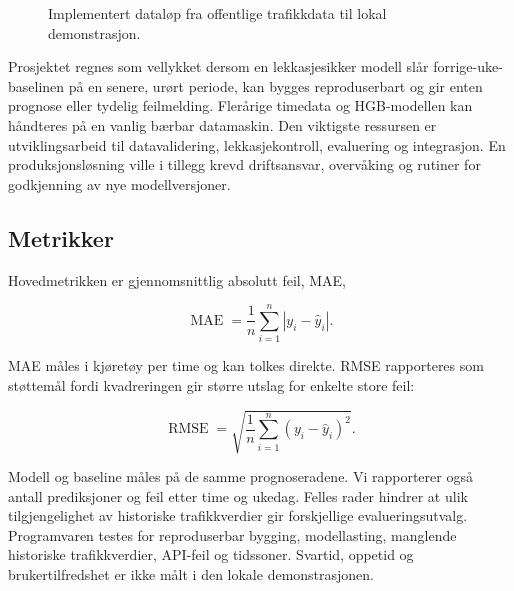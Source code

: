 \begin{figure}[htbp]
  \centering
  \resizebox{\textwidth}{!}{}
  \caption{Implementert dataløp fra offentlige trafikkdata til lokal demonstrasjon.}
  \label{fig:pipeline}
\end{figure}
\FloatBarrier

Prosjektet regnes som vellykket dersom en lekkasjesikker modell slår
forrige-uke-baselinen på en senere, urørt periode, kan bygges reproduserbart og gir
enten prognose eller tydelig feilmelding. Flerårige timedata og HGB-modellen kan
håndteres på en vanlig bærbar datamaskin. Den viktigste ressursen er
utviklingsarbeid til datavalidering, lekkasjekontroll, evaluering og integrasjon.
En produksjonsløsning ville i tillegg krevd driftsansvar, overvåking og rutiner for
godkjenning av nye modellversjoner.

\subsection{Metrikker}

Hovedmetrikken er gjennomsnittlig absolutt feil, MAE,

\begin{equation}
  \operatorname{MAE}=\frac{1}{n}\sum_{i=1}^{n}|y_i-\hat{y}_i|.
\end{equation}

MAE måles i kjøretøy per time og kan tolkes direkte. RMSE rapporteres som støttemål
fordi kvadreringen gir større utslag for enkelte store feil:

\begin{equation}
  \operatorname{RMSE}=\sqrt{\frac{1}{n}\sum_{i=1}^{n}(y_i-\hat{y}_i)^2}.
\end{equation}

Modell og baseline måles på de samme prognoseradene. Vi rapporterer også antall
prediksjoner og feil etter time og ukedag. Felles rader hindrer at ulik
tilgjengelighet av historiske trafikkverdier gir forskjellige evalueringsutvalg.
Programvaren testes for reproduserbar bygging, modellasting, manglende historiske
trafikkverdier, API-feil og tidssoner. Svartid,
oppetid og brukertilfredshet er ikke målt i den lokale demonstrasjonen.
